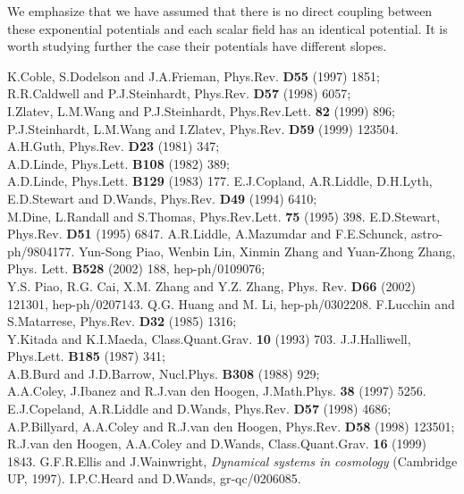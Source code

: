 \documentclass[a4paper,12pt]{article}
\begin{document}
We emphasize that we have assumed that there is no direct coupling
between these exponential potentials and each scalar field has an
identical potential. It is worth studying further the case their
potentials have different slopes.




\begin{thebibliography}{99}

K.Coble, S.Dodelson and J.A.Frieman, Phys.Rev.
{\bf D55} (1997) 1851;\\
R.R.Caldwell and P.J.Steinhardt, Phys.Rev. {\bf D57} (1998) 6057;\\
I.Zlatev, L.M.Wang and P.J.Steinhardt, Phys.Rev.Lett.
{\bf 82} (1999) 896;\\
P.J.Steinhardt, L.M.Wang and I.Zlatev, Phys.Rev. {\bf D59} (1999)
123504.
A.H.Guth, Phys.Rev. {\bf D23} (1981) 347;\\
A.D.Linde, Phys.Lett. {\bf B108} (1982) 389;\\
A.D.Linde, Phys.Lett. {\bf B129} (1983) 177.
E.J.Copland, A.R.Liddle, D.H.Lyth, E.D.Stewart and D.Wands,
Phys.Rev. {\bf D49} (1994) 6410;\\
M.Dine, L.Randall and S.Thomas, Phys.Rev.Lett. {\bf 75} (1995)
398.
E.D.Stewart, Phys.Rev. {\bf D51} (1995) 6847.
A.R.Liddle, A.Mazumdar and F.E.Schunck,
astro-ph/9804177.
Yun-Song Piao, Wenbin Lin,
Xinmin Zhang and Yuan-Zhong Zhang, Phys. Lett. {\bf B528}
(2002) 188, hep-ph/0109076; \\
Y.S. Piao, R.G. Cai, X.M. Zhang and
Y.Z. Zhang, Phys. Rev. {\bf D66} (2002) 121301, hep-ph/0207143.
Q.G. Huang and M. Li, hep-ph/0302208.
F.Lucchin and S.Matarrese, Phys.Rev. {\bf D32} (1985) 1316;\\
Y.Kitada and K.I.Maeda, Class.Quant.Grav. {\bf 10} (1993) 703.
J.J.Halliwell, Phys.Lett. {\bf B185} (1987) 341;\\
A.B.Burd and J.D.Barrow, Nucl.Phys. {\bf B308} (1988) 929;\\
A.A.Coley, J.Ibanez and R.J.van den Hoogen, J.Math.Phys. {\bf 38}
(1997) 5256.
E.J.Copeland, A.R.Liddle and D.Wands, Phys.Rev. {\bf D57}
(1998) 4686;\\
A.P.Billyard, A.A.Coley and R.J.van den Hoogen, Phys.Rev. {\bf
D58} (1998)
123501;\\
R.J.van den Hoogen, A.A.Coley and D.Wands, Class.Quant.Grav. {\bf
16} (1999) 1843.
G.F.R.Ellis and J.Wainwright, {\it Dynamical systems in
cosmology} (Cambridge UP, 1997).
I.P.C.Heard and D.Wands, gr-qc/0206085.


\end{thebibliography}
\end{document}
